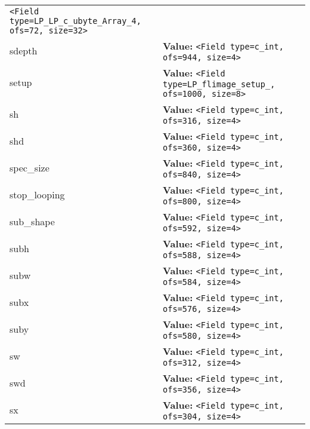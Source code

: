 \begin{longtable}{|p{\varnamewidth}|p{\vardescrwidth}|l}
{\tt {\textless}Field type=LP\_LP\_c\_ubyte\_Array\_4, ofs=72, size=32{\textgreater}}&\\
\cline{1-2}
\raggedright s\-d\-e\-p\-t\-h\- & \raggedright \textbf{Value:} 
{\tt {\textless}Field type=c\_int, ofs=944, size=4{\textgreater}}&\\
\cline{1-2}
\raggedright s\-e\-t\-u\-p\- & \raggedright \textbf{Value:} 
{\tt {\textless}Field type=LP\_flimage\_setup\_, ofs=1000, size=8{\textgreater}}&\\
\cline{1-2}
\raggedright s\-h\- & \raggedright \textbf{Value:} 
{\tt {\textless}Field type=c\_int, ofs=316, size=4{\textgreater}}&\\
\cline{1-2}
\raggedright s\-h\-d\- & \raggedright \textbf{Value:} 
{\tt {\textless}Field type=c\_int, ofs=360, size=4{\textgreater}}&\\
\cline{1-2}
\raggedright s\-p\-e\-c\-\_\-s\-i\-z\-e\- & \raggedright \textbf{Value:} 
{\tt {\textless}Field type=c\_int, ofs=840, size=4{\textgreater}}&\\
\cline{1-2}
\raggedright s\-t\-o\-p\-\_\-l\-o\-o\-p\-i\-n\-g\- & \raggedright \textbf{Value:} 
{\tt {\textless}Field type=c\_int, ofs=800, size=4{\textgreater}}&\\
\cline{1-2}
\raggedright s\-u\-b\-\_\-s\-h\-a\-p\-e\- & \raggedright \textbf{Value:} 
{\tt {\textless}Field type=c\_int, ofs=592, size=4{\textgreater}}&\\
\cline{1-2}
\raggedright s\-u\-b\-h\- & \raggedright \textbf{Value:} 
{\tt {\textless}Field type=c\_int, ofs=588, size=4{\textgreater}}&\\
\cline{1-2}
\raggedright s\-u\-b\-w\- & \raggedright \textbf{Value:} 
{\tt {\textless}Field type=c\_int, ofs=584, size=4{\textgreater}}&\\
\cline{1-2}
\raggedright s\-u\-b\-x\- & \raggedright \textbf{Value:} 
{\tt {\textless}Field type=c\_int, ofs=576, size=4{\textgreater}}&\\
\cline{1-2}
\raggedright s\-u\-b\-y\- & \raggedright \textbf{Value:} 
{\tt {\textless}Field type=c\_int, ofs=580, size=4{\textgreater}}&\\
\cline{1-2}
\raggedright s\-w\- & \raggedright \textbf{Value:} 
{\tt {\textless}Field type=c\_int, ofs=312, size=4{\textgreater}}&\\
\cline{1-2}
\raggedright s\-w\-d\- & \raggedright \textbf{Value:} 
{\tt {\textless}Field type=c\_int, ofs=356, size=4{\textgreater}}&\\
\cline{1-2}
\raggedright s\-x\- & \raggedright \textbf{Value:} 
{\tt {\textless}Field type=c\_int, ofs=304, size=4{\textgreater}}&\\

\end{longtable}
